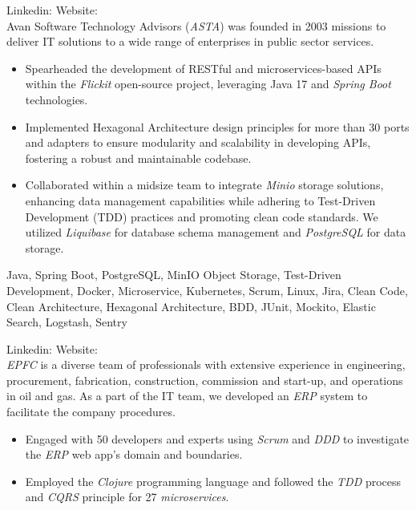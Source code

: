 \begin{experiences}
{
  Linkedin: 
  Website: \\
  Avan Software Technology Advisors (\emph{ASTA}) was founded in 2003 missions to deliver IT solutions to a wide range of enterprises in public sector services.
  \begin{itemize}
    \item Spearheaded the development of RESTful and microservices-based APIs within the \emph{Flickit} open-source project, leveraging Java 17 and \emph{Spring Boot} technologies.
    \item Implemented Hexagonal Architecture design principles for more than 30 ports and adapters to ensure modularity and scalability in developing APIs, fostering a robust and maintainable codebase.
    \item Collaborated within a midsize team to integrate \emph{Minio} storage solutions, enhancing data management capabilities while adhering to Test-Driven Development (TDD) practices and promoting clean code standards. We utilized \emph{Liquibase} for database schema management and \emph{PostgreSQL} for data storage.  \end{itemize}}
    {Java, Spring Boot, PostgreSQL, MinIO Object Storage, Test-Driven Development, Docker, Microservice, Kubernetes, Scrum, Linux, Jira, Clean Code, Clean Architecture, Hexagonal Architecture, BDD, JUnit, Mockito, Elastic Search, Logstash, Sentry}
 \emptySeparator
{
  Linkedin: 
  Website: \\
  \emph{EPFC} is a diverse team of professionals with extensive experience in engineering, procurement, fabrication, construction, commission and start-up, and operations in oil and gas. As a part of the IT team, we developed an \emph{ERP} system to facilitate the company procedures.
  \begin{itemize}
  \item Engaged with 50 developers and experts using \emph{Scrum} and \emph{DDD} to investigate the \textit{ERP} web app's domain and boundaries.
  \item Employed the \emph{Clojure} programming language and followed the \emph{TDD} process and \textit{CQRS} principle for 27 \emph{microservices}.

\end{itemize}}
\end{experiences}
